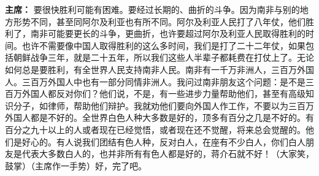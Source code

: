 \begin{list}{}
\item[\textbf{主席：}] 要很快胜利可能有困难。要经过长期的、曲折的斗争。因为南非与别的地方形势不同，甚至同阿尔及利亚也有所不同。阿尔及利亚人民打了八年仗，他们胜利了，南非可能要更长的斗争，更曲折，也许要超过阿尔及利亚人民取得胜利的时间。也许不需要像中国人取得胜利的这么多时间，我们是打了二十二年仗，如果包括朝鲜战争三年，就是二十五年，所以我们这些人半辈子都耗费在打仗上了。无论如何总是要胜利，有全世界人民支持南非人民。南非有一千万非洲人，三百万外国人。三百万外国人中也有一部分同情非洲人。我问过南非朋友这个问题：是不是三百万外国人都反对你们？他们说，不是，有一些进步力量帮助他们，甚至有高级知识分子，如律师，帮助他们辩护。我就劝他们要向外国人作工作，不要以为三百万外国人都是不好的。全世界白色人种大多数是好的，顶多有百分之几是不好的。有百分之九十以上的人或者现在已经觉悟，或者现在还不觉醒，将来总会觉醒的。他们是好心的。有人说我们团结有色人种，反对白人，在座有不少白人，你们白人朋友是代表大多数白人的，也并非所有有色人都是好的，蒋介石就不好！（大家笑，鼓掌）（主席作一手势）好，完了吧。
 
\end{list}